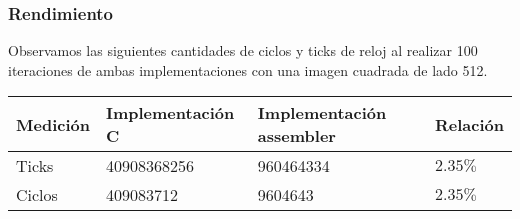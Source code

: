 \subsubsection{Rendimiento}

Observamos las siguientes cantidades de ciclos y ticks de reloj al realizar 100 iteraciones de ambas implementaciones con una imagen cuadrada de lado 512.
\begin{center}
    \begin{tabular}{|l|l|l|l|}
        \hline
        Medición & Implementación C & Implementación assembler & Relación \\
        \hline
        Ticks    & 40908368256      & 960464334            & $2.35\%$ \\
        Ciclos   & 409083712        & 9604643              & $2.35\%$ \\
        \hline
    \end{tabular}
\end{center}